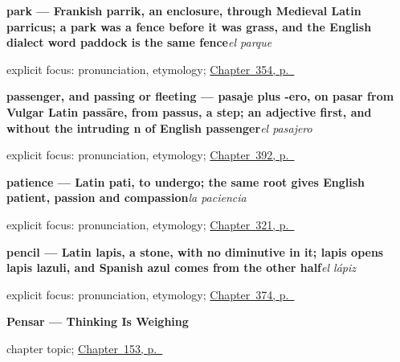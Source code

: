 \noindent\begin{minipage}[t]{\linewidth}
\raggedright
\textbf{park — Frankish parrik, an enclosure, through Medieval Latin parricus; a park was a fence before it was grass, and the English dialect word paddock is the same fence}\enspace\emph{el parque}\par
\footnotesize explicit focus: pronunciation, etymology; \hyperref[ch:el-hotel-y-el-cine]{Chapter~354, p.~\pageref*{ch:el-hotel-y-el-cine}}
\end{minipage}\par\smallskip

\noindent\begin{minipage}[t]{\linewidth}
\raggedright
\textbf{passenger, and passing or fleeting — pasaje plus -ero, on pasar from Vulgar Latin passāre, from passus, a step; an adjective first, and without the intruding n of English passenger}\enspace\emph{el pasajero}\par
\footnotesize explicit focus: pronunciation, etymology; \hyperref[ch:el-aeropuerto-y-las-vacaciones]{Chapter~392, p.~\pageref*{ch:el-aeropuerto-y-las-vacaciones}}
\end{minipage}\par\smallskip

\noindent\begin{minipage}[t]{\linewidth}
\raggedright
\textbf{patience — Latin pati, to undergo; the same root gives English patient, passion and compassion}\enspace\emph{la paciencia}\par
\footnotesize explicit focus: pronunciation, etymology; \hyperref[ch:placer-y-consejo]{Chapter~321, p.~\pageref*{ch:placer-y-consejo}}
\end{minipage}\par\smallskip

\noindent\begin{minipage}[t]{\linewidth}
\raggedright
\textbf{pencil — Latin lapis, a stone, with no diminutive in it; lapis opens lapis lazuli, and Spanish azul comes from the other half}\enspace\emph{el lápiz}\par
\footnotesize explicit focus: pronunciation, etymology; \hyperref[ch:el-lapiz-y-el-cepillo]{Chapter~374, p.~\pageref*{ch:el-lapiz-y-el-cepillo}}
\end{minipage}\par\smallskip

\noindent\begin{minipage}[t]{\linewidth}
\raggedright
\textbf{Pensar — Thinking Is Weighing}\par
\footnotesize chapter topic; \hyperref[ch:spanish-pensar]{Chapter~153, p.~\pageref*{ch:spanish-pensar}}
\end{minipage}\par\smallskip

